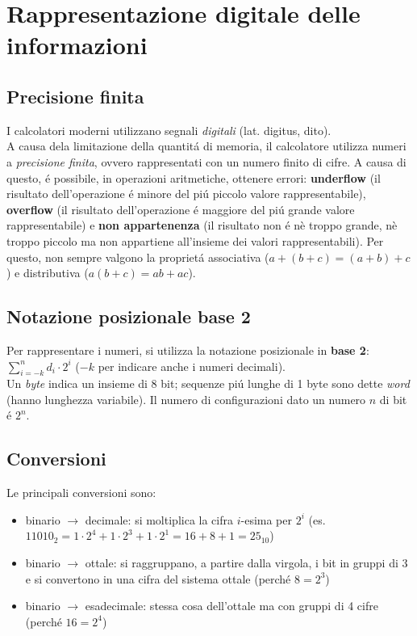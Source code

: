 \documentclass{article}
\begin{document}
\section{Rappresentazione digitale delle informazioni}

\subsection{Precisione finita}
I calcolatori moderni utilizzano segnali \textit{digitali} (lat. digitus, dito).\\
A causa dela limitazione della quantitá di memoria, il calcolatore utilizza numeri a \textit{precisione finita}, ovvero rappresentati con un numero finito di cifre. A causa di questo, é possibile, in operazioni aritmetiche, ottenere errori: \textbf{underflow} (il risultato dell'operazione é minore del piú piccolo valore rappresentabile), \textbf{overflow} (il risultato dell'operazione é maggiore del piú grande valore rappresentabile) e \textbf{non appartenenza} (il risultato non é nè troppo grande, nè troppo piccolo ma non appartiene all'insieme dei valori rappresentabili). Per questo, non sempre valgono la proprietá associativa ($a+(b+c)=(a+b)+c$) e distributiva ($a(b+c)=ab+ac$).

\subsection{Notazione posizionale base 2}
Per rappresentare i numeri, si utilizza la notazione posizionale in \textbf{base 2}: $\displaystyle \sum_{i=-k}^{n} d_i \cdot 2^i$ ($-k$ per indicare anche i numeri decimali).\\
Un \textit{byte} indica un insieme di 8 bit; sequenze piú lunghe di 1 byte sono dette \textit{word} (hanno lunghezza variabile). Il numero di configurazioni dato un numero $n$ di bit é $2^n$.

\subsection{Conversioni}
Le principali conversioni sono:
\begin{itemize}
	\item binario $\rightarrow$ decimale: si moltiplica la cifra $i$-esima per $2^i$ (es. $11010_2 = 1\cdot2^4 + 1\cdot2^3 + 1\cdot2^1 = 16+8+1 = 25_{10}$)
	\item binario $\rightarrow$ ottale: si raggruppano, a partire dalla virgola, i bit in gruppi di 3 e si convertono in una cifra del sistema ottale (perché $8=2^3$)
	\item binario $\rightarrow$ esadecimale: stessa cosa dell'ottale ma con gruppi di 4 cifre (perché $16=2^4$)
\end{itemize}
\end{document}

